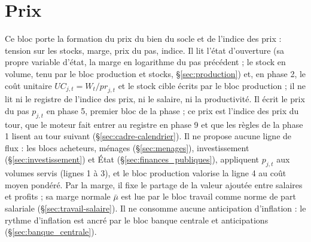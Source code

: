 \documentclass[11pt,a4paper]{article}
\begin{document}
\section{Prix}
\label{sec:prix}
Ce bloc porte la formation du prix du bien du socle et de l'indice des prix : tension sur les stocks, marge, prix du pas, indice. Il lit l'état d'ouverture (sa propre variable d'état, la marge en logarithme du pas précédent ; le stock en volume, tenu par le bloc production et stocks, \S\ref{sec:production}) et, en phase 2, le coût unitaire $\mathit{UC}_{j,t} = W_t/\mathit{pr}_{j,t}$ et le stock cible écrits par le bloc production ; il ne lit ni le registre de l'indice des prix, ni le salaire, ni la productivité. Il écrit le prix du pas $p_{j,t}$ en phase 5, premier bloc de la phase ; ce prix est l'indice des prix du tour, que le moteur fait entrer au registre en phase 9 et que les règles de la phase 1 lisent au tour suivant (\S\ref{sec:cadre-calendrier}). Il ne propose aucune ligne de flux : les blocs acheteurs, ménages (\S\ref{sec:menages}), investissement (\S\ref{sec:investissement}) et État (\S\ref{sec:finances_publiques}), appliquent $p_{j,t}$ aux volumes servis (lignes 1 à 3), et le bloc production valorise la ligne 4 au coût moyen pondéré. Par la marge, il fixe le partage de la valeur ajoutée entre salaires et profits ; sa marge normale $\bar\mu$ est lue par le bloc travail comme norme de part salariale (\S\ref{sec:travail-salaire}). Il ne consomme aucune anticipation d'inflation : le rythme d'inflation est ancré par le bloc banque centrale et anticipations (\S\ref{sec:banque_centrale}).
\end{document}
